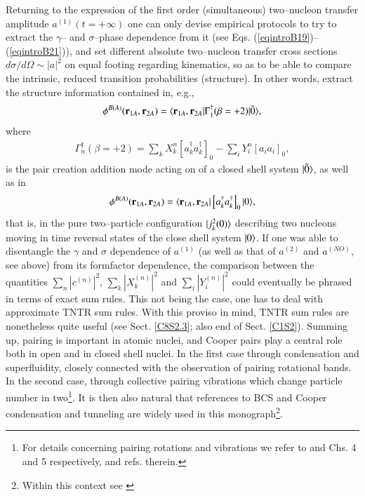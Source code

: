 Returning to the expression of the first order (simultaneous) two--nucleon transfer amplitude $a^{(1)}(t=+\infty)$ one can only devise empirical protocols to try to extract the $\gamma$-- and $\sigma$--phase dependence  from it (see Eqs. (\ref{eqintroB19})--(\ref{eqintroB21})), and set different absolute two--nucleon transfer cross sections $d\sigma/d\Omega\sim |a|^2$ on equal footing regarding kinematics, so as to be able to compare the intrinsic, reduced transition probabilities (structure). In other words, extract the structure information contained in, e.g.,
 \begin{align}
\phi^{B(A)}(\mathbf r_{1A},\mathbf r_{2A})=\langle {\mathbf r_{1A},\mathbf r_{2A}|\Gamma^\dagger_1(\beta=+2)|\tilde 0} \rangle,
 \end{align}
where
 \begin{align}
\Gamma_n^\dagger(\beta=+2)=\sum_k X_k^n\left[a^\dagger_ka^\dagger_k\right]_0-\sum_i Y^n_i \left[a_i a_i\right]_0,
 \end{align}
is the pair creation addition mode acting on of a closed shell system $|{\tilde 0} \rangle$, as well as in
 \begin{align}
\phi^{B(A)}(\mathbf r_{1A},\mathbf r_{2A})=\langle {\mathbf r_{1A},\mathbf r_{2A}}|\left[a^\dagger_ka^\dagger_k\right]_0|{0} \rangle,
 \end{align}
that is, in the pure two--particle configuration $|{j^2_k(0)} \rangle$ describing two nucleons moving in time reversal states of the close shell system $|{0} \rangle$. If one was able to disentangle the $\gamma$ and $\sigma$ dependence of $a^{(1)}$ (as well as that of $a^{(2)}$ and $a^{(NO)}$, see above) from its formfactor dependence, the comparison between the quantities $\sum_n|c^{(n)}|^2$, $\sum_k|X^{(n)}_k|^2$ and $\sum_i|Y^{(n)}_i|^2$ could  eventually be phrased in terms of exact sum rules. This not being  the case, one has to  deal with approximate TNTR sum rules. With this proviso in mind, TNTR sum rules are nonetheless quite useful (see Sect. \ref{C8S2.3}; also end of Sect. \ref{C1S2}). Summing up, pairing is important in atomic nuclei, and Cooper pairs play a central role both in open and in closed shell nuclei. In the first case through condensation and superfluidity, closely connected with the observation of pairing rotational bands. In the second case, through collective pairing vibrations which change particle number in two\footnote{For details concerning pairing rotations and vibrations we refer to \cite{Bes:77} and \cite{Brink:05} Chs. 4 and 5 respectively, and refs. therein.}. It is then also natural that references to BCS and Cooper condensation and tunneling are widely used in this monograph\footnote{Within this context see \cite{Broglia:13}}.

